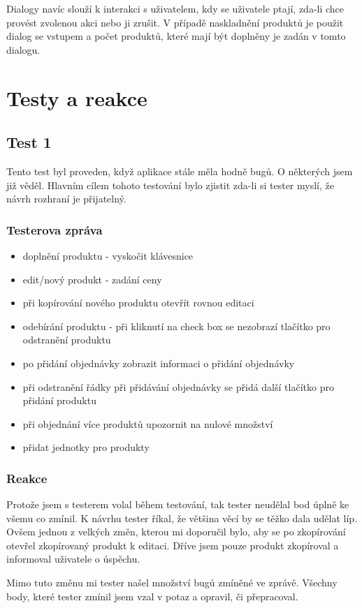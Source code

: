 \documentclass[12pt]{report}
\begin{document}
Dialogy navíc slouží k interakci s uživatelem, kdy se uživatele ptají, zda-li chce provést zvolenou akci
nebo ji zrušit. V případě naskladnění produktů je použit dialog se vstupem a počet produktů, které mají
být doplněny je zadán v tomto dialogu.
%
\chapter{Testy a reakce}
%
\section{Test 1}
Tento test byl proveden, když aplikace stále měla hodně bugů. O některých jsem již věděl. 
Hlavním cílem tohoto testování bylo zjistit zda-li si tester myslí, že návrh rozhraní je přijatelný.
\subsection{Testerova zpráva}
\begin{itemize}
	\item doplnění produktu - vyskočit klávesnice
	\item edit/nový produkt - zadání ceny
	\item při kopírování nového produktu otevřít rovnou editaci
	\item odebírání produktu - při kliknutí na check box se nezobrazí tlačítko pro odstranění produktu
	\item po přidání objednávky zobrazit informaci o přidání objednávky
	\item při odstranění řádky při přidávání objednávky se přidá další tlačítko pro přidání produktu
	\item při objednání více produktů upozornit na nulové množství
	\item přidat jednotky pro produkty
\end{itemize}
%
\subsection{Reakce}
Protože jsem s testerem volal během testování, tak tester neudělal bod úplně ke všemu co zmínil. K návrhu 
tester říkal, že většina věcí by se těžko dala udělat líp. Ovšem jednou z velkých změn, kterou mi
doporučil bylo, aby se po zkopírování otevřel zkopírovaný produkt k editaci. Dříve jsem pouze 
produkt zkopíroval a informoval uživatele o úspěchu.

Mimo tuto změnu mi tester našel množství bugů zmíněné ve zprávě. Všechny body, které tester zmínil 
jsem vzal v potaz a opravil, či přepracoval.
%
\end{document}
